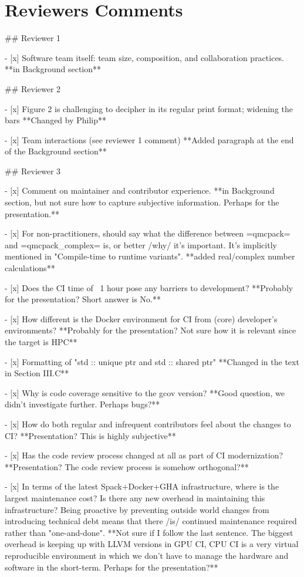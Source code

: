 

\section*{Reviewers Comments}

\begin{markdown}

## Reviewer 1

- [x] Software team itself: team size, composition, and collaboration practices. **in Background section**

## Reviewer 2

- [x] Figure 2 is challenging to decipher in its regular print format; widening the bars **Changed by Philip**

- [x] Team interactions (see reviewer 1 comment) **Added paragraph at the end of the Background section**

## Reviewer 3 

- [x] Comment on maintainer and contributor experience. **in Background section, but not sure how to capture subjective information. Perhaps for the presentation.**

- [x] For non-practitioners, should say what the difference between =qmcpack= and =qmcpack_complex= is, or better /why/ it's important.  It's implicitly mentioned in "Compile-time to runtime variants". **added real/complex number calculations**

- [x] Does the CI time of ~1 hour pose any barriers to development? **Probably for the presentation? Short answer is No.**

- [x] How different is the Docker environment for CI from (core) developer's environments? **Probably for the presentation? Not sure how it is relevant since the target is HPC**

- [x] Formatting of "std :: unique ptr and std :: shared ptr" **Changed in the text in Section III.C**

- [x] Why is code coverage sensitive to the gcov version? **Good question, we didn't investigate further. Perhaps bugs?**

- [x] How do both regular and infrequent contributors feel about the changes to CI? **Presentation? This is highly subjective**

- [x] Has the code review process changed at all as part of CI modernization? **Presentation? The code review process is somehow orthogonal?**

- [x] In terms of the latest Spack+Docker+GHA infrastructure, where is the largest maintenance cost?  Is there any new overhead in maintaining this infrastructure?  Being proactive by preventing outside world changes from introducing technical debt means that there /is/ continued maintenance required rather than "one-and-done". **Not sure if I follow the last sentence. The biggest overhead is keeping up with LLVM versions in GPU CI, CPU CI is a very virtual reproducible environment in which we don't have to manage the hardware and software in the short-term. Perhaps for the presentation?**


\end{markdown}

